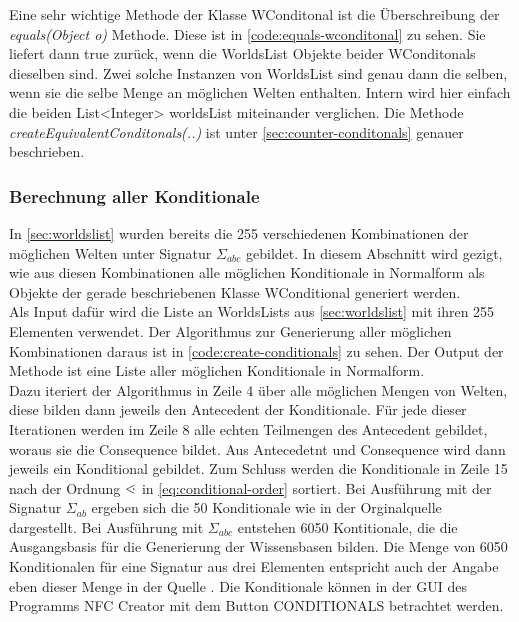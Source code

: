 \documentclass[12pt,a4paper]{article}
\newcommand\dotl{\mathrel{%
    \mathchoice{\QEQ}{\QEQ}{\QEQ}{\QEQ}%
}}
\def\QEQ{{%
    \setbox0\hbox{<}%
    \rlap{\hbox to \wd0{\hss \raisebox {0.1pt}{$\ \cdot$\hss}}}\box0
}}
\begin{document}
Eine sehr wichtige Methode der Klasse WConditonal ist die Überschreibung der \textit{equals(Object o)} Methode. Diese ist in \autoref{code:equals-wconditonal} zu sehen. Sie liefert dann true zurück, wenn die WorldsList Objekte beider WConditonals dieselben sind. Zwei solche Instanzen von WorldsList sind genau dann die selben, wenn sie die selbe Menge an möglichen Welten enthalten. Intern wird hier einfach die beiden List<Integer> worldsList miteinander verglichen. Die Methode \textit{createEquivalentConditonals(..)} ist unter \autoref{sec:counter-conditonals} genauer beschrieben.


\subsubsection{Berechnung aller Konditionale}




In \autoref{sec:worldslist} wurden bereits die 255 verschiedenen Kombinationen der möglichen Welten unter Signatur $\Sigma_{abc}$ gebildet. In diesem Abschnitt wird gezigt, wie aus diesen Kombinationen alle möglichen Konditionale in Normalform als Objekte der gerade beschriebenen Klasse WConditional generiert werden. \\
Als Input dafür wird die Liste an WorldsLists aus \autoref{sec:worldslist} mit ihren 255 Elementen verwendet. Der Algorithmus zur Generierung aller möglichen Kombinationen daraus ist in \autoref{code:create-conditionals} zu sehen. Der Output der Methode ist eine Liste aller möglichen Konditionale in Normalform. \\
Dazu iteriert der Algorithmus in Zeile 4 über alle möglichen Mengen von Welten, diese bilden dann jeweils den Antecedent der Konditionale. Für jede dieser Iterationen werden im Zeile 8 alle echten Teilmengen des Antecedent gebildet, woraus sie die Consequence bildet. Aus Antecedetnt und Consequence wird dann jeweils ein Konditional gebildet. Zum Schluss werden die Konditionale in Zeile 15 nach der Ordnung $\dotl$ in \autoref{eq:conditional-order} sortiert. Bei Ausführung mit der Signatur $\Sigma_{ab}$ ergeben sich die 50 Konditionale wie in der Orginalquelle \cite{beierle19} dargestellt. Bei Ausführung mit $\Sigma_{abc}$ entstehen 6050 Kontitionale, die die Ausgangsbasis für die Generierung der Wissensbasen bilden. Die Menge von 6050 Konditionalen für eine Signatur aus drei Elementen entspricht auch der Angabe eben dieser Menge in  der Quelle \cite{beierle19b}. Die Konditionale können in der GUI des Programms NFC Creator mit dem Button CONDITIONALS betrachtet werden.
\end{document}
